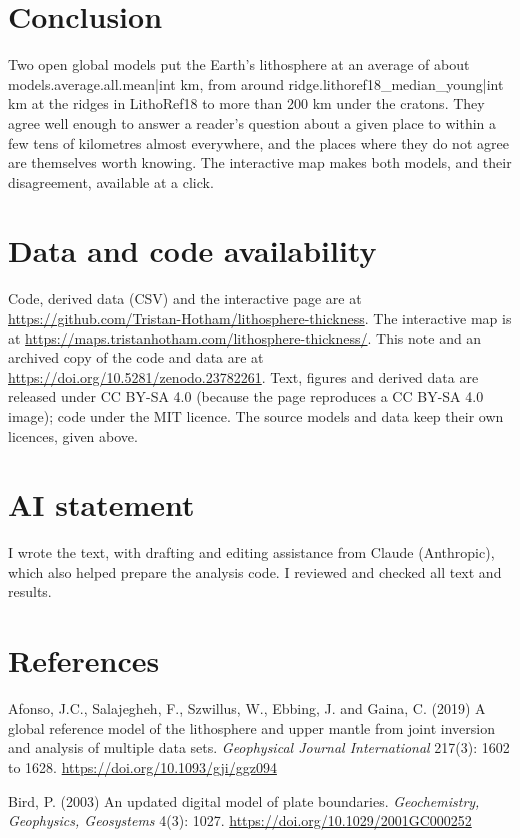 \documentclass[11pt,a4paper]{article}
\begin{document}
\section{Conclusion}

Two open global models put the Earth's lithosphere at an average of about {{models.average.all.mean|int}} km, from around {{ridge.lithoref18_median_young|int}} km at the ridges in LithoRef18 to more than 200 km under the cratons. They agree well enough to answer a reader's question about a given place to within a few tens of kilometres almost everywhere, and the places where they do not agree are themselves worth knowing. The interactive map makes both models, and their disagreement, available at a click.

\section*{Data and code availability}

Code, derived data (CSV) and the interactive page are at \url{https://github.com/Tristan-Hotham/lithosphere-thickness}. The interactive map is at \url{https://maps.tristanhotham.com/lithosphere-thickness/}. This note and an archived copy of the code and data are at \url{https://doi.org/10.5281/zenodo.23782261}. Text, figures and derived data are released under CC BY-SA 4.0 (because the page reproduces a CC BY-SA 4.0 image); code under the MIT licence. The source models and data keep their own licences, given above.

\section*{AI statement}

I wrote the text, with drafting and editing assistance from Claude (Anthropic), which also helped prepare the analysis code. I reviewed and checked all text and results.

\section*{References}
\small
\setlength{\parskip}{0.35em}
Afonso, J.C., Salajegheh, F., Szwillus, W., Ebbing, J. and Gaina, C. (2019) A global reference model of the lithosphere and upper mantle from joint inversion and analysis of multiple data sets. \emph{Geophysical Journal International} 217(3): 1602 to 1628. \url{https://doi.org/10.1093/gji/ggz094}

Bird, P. (2003) An updated digital model of plate boundaries. \emph{Geochemistry, Geophysics, Geosystems} 4(3): 1027. \url{https://doi.org/10.1029/2001GC000252}
\end{document}

